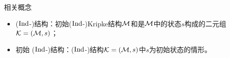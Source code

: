 \documentclass[9pt, CJK]{beamer}
\begin{document}
\begin{frame}
{%
		\begin{block}{相关概念}
			\begin{itemize}
				\item \textcolor{blue!80}{($\textrm{Ind}$-)结构}：初始($\textrm{Ind}$-)Kripke结构${\cal M}$和是${\cal M}$中的状态$s$构成的二元组${\cal K}=({\cal M}, s)$；
				\item \textcolor{blue!80}{初始 ($\textrm{Ind}$-)结构}：($\textrm{Ind}$-)结构${\cal K}=({\cal M}, s)$中$s$为初始状态的情形。
			\end{itemize} 
		
		\end{block}
}
\end{frame}
\end{document}

